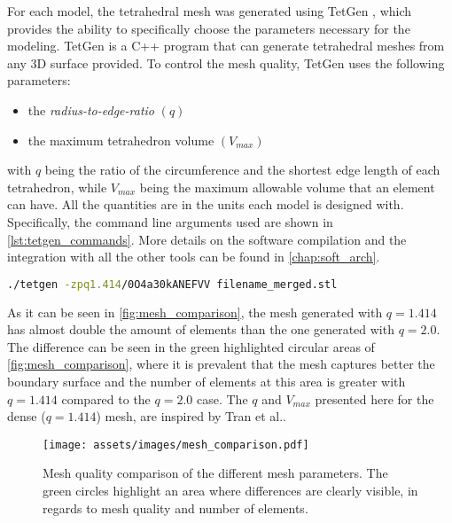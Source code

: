 For each model, the tetrahedral mesh was generated using TetGen \cite{tetgen}, which provides the ability to specifically choose the parameters necessary for the modeling. TetGen \cite{tetgen} is a C++ program that can generate tetrahedral meshes from any 3D surface provided. To control the mesh quality, TetGen \cite{tetgen} uses the following parameters:
\begin{itemize}
	\item the \textit{radius-to-edge-ratio} $(q)$
	\item the maximum tetrahedron volume $(V_{max})$
\end{itemize}
with $q$ being the ratio of the circumference and the shortest edge length of each tetrahedron, while $V_{max}$ being the maximum allowable volume that an element can have. All the quantities are in the units each model is designed with. Specifically, the command line arguments used are shown in \autoref{lst:tetgen_commands}. More details on the software compilation and the integration with all the other tools can be found in \autoref{chap:soft_arch}.
\begin{lstlisting}[language=bash,caption={Command to run TetGen},captionpos=b, label=lst:tetgen_commands]
	./tetgen -zpq1.414/0O4a30kANEFVV filename_merged.stl
\end{lstlisting}

As it can be seen in \autoref{fig:mesh_comparison}, the mesh generated with $q = 1.414$ has almost double the amount of elements than the one generated with $q = 2.0$. The difference can be seen in the green highlighted circular areas of \autoref{fig:mesh_comparison}, where it is prevalent that the mesh captures better the boundary surface and the number of elements at this area is greater with $q = 1.414$ compared to the $q = 2.0$ case. The $q$ and $V_{max}$ presented here for the dense ($q=1.414$) mesh, are inspired by Tran et al.\cite{Tran2020}.

\begin{figure}[H]
    \centering
    \texttt{[image: assets/images/mesh\_comparison.pdf]}
    \caption[Mesh quality comparison for the different $q$ parameters.]{Mesh quality comparison of the different mesh parameters. The green circles highlight an area where differences are clearly visible, in regards to mesh quality and number of elements.}
    \label{fig:mesh_comparison}
\end{figure}

